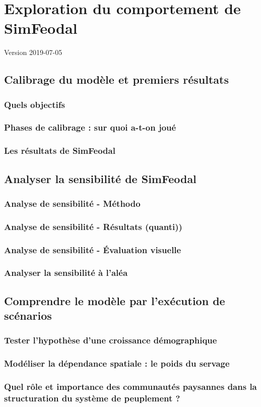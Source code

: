 \chapter{Exploration du comportement de SimFeodal}
\label{chap:chap6}
\begin{center}
	{\large Version 2019-07-05}
\end{center}
\minitoc

\section{Calibrage du modèle et premiers résultats}
\subsection{Quels objectifs}
\subsection{Phases de calibrage : sur quoi a-t-on joué}
\subsection{Les \og résultats\fg{} de SimFeodal}

\section{Analyser la sensibilité de SimFeodal}
\subsection{Analyse de sensibilité - Méthodo}
\subsection{Analyse de sensibilité - Résultats (quanti))}
\subsection{Analyse de sensibilité - Évaluation visuelle}
\subsection{Analyser la sensibilité à l'aléa}

\section{Comprendre le modèle par l'exécution de scénarios}
\subsection{Tester l'hypothèse d'une croissance démographique}
\subsection{Modéliser la dépendance spatiale : le poids du servage}
\subsection{Quel rôle et importance des communautés paysannes dans la structuration du système de peuplement ?}